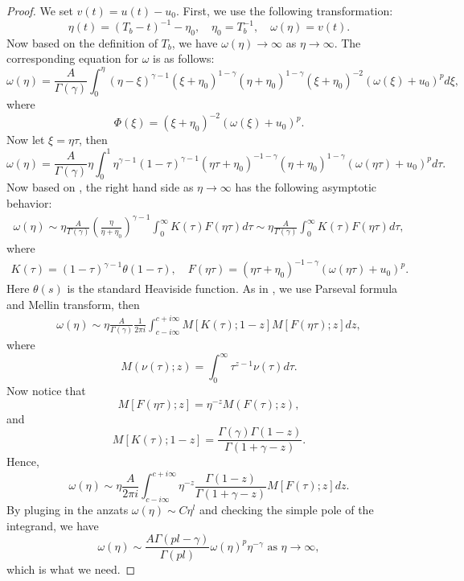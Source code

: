 \documentclass[12pt]{amsart}%
\theoremstyle{definition}
\theoremstyle{remark}
\begin{document}
\begin{proof}
We set $v(t)=u(t)-u_0$. First, we use the following transformation:
\begin{equation}
\eta(t)=(T_b-t)^{-1}-\eta_0,\quad \eta_0=T_b^{-1},\quad \omega(\eta)=v(t).
\end{equation}
Now based on the definition of $T_b$, we have $\omega(\eta)\rightarrow \infty$ as $\eta\rightarrow \infty$. The corresponding equation for $\omega$ is as follows:
\begin{equation}\label{23}
\omega(\eta)=\frac{A}{\Gamma(\gamma)}\int_0^{\eta}(\eta-\xi)^{\gamma-1}(\xi+\eta_0)^{1-\gamma}(\eta+\eta_0)^{1-\gamma}(\xi+\eta_0)^{-2}(\omega(\xi)+u_0)^pd\xi,
\end{equation}
where
\begin{equation}
\Phi(\xi)=(\xi+\eta_0)^{-2}(\omega(\xi)+u_0)^p.
\end{equation}
Now let $\xi=\eta\tau$, then 
\begin{equation}
\omega(\eta)=\frac{A}{\Gamma(\gamma)}\eta\int_0^1\eta^{\gamma-1}(1-\tau)^{\gamma-1}(\eta\tau+\eta_0)^{-1-\gamma}(\eta+\eta_0)^{1-\gamma}(\omega(\eta\tau)+u_0)^pd\tau.
\end{equation}
Now based on \cite{bleistein1975asymptotic}, the right hand side as $\eta\rightarrow \infty$ has the following asymptotic behavior:
\begin{align*}
\omega(\eta)\sim \eta\frac{A}{\Gamma(\gamma)}\left(\frac{\eta}{\eta+\eta_0}\right)^{\gamma-1}\int_0^{\infty}K(\tau)F(\eta\tau)d\tau\sim \eta \frac{A}{\Gamma(\gamma)}\int_0^{\infty}K(\tau)F(\eta\tau)d\tau,
\end{align*}
where
\begin{align*}
K(\tau)=(1-\tau)^{\gamma-1}\theta(1-\tau),\quad F(\eta\tau)=(\eta\tau+\eta_0)^{-1-\gamma}(\omega(\eta\tau)+u_0)^p.
\end{align*}
Here $\theta(s)$ is the standard Heaviside function. As in \cite{bleistein1975asymptotic}, we use Parseval formula and Mellin transform, then
\begin{align*}
\omega(\eta)\sim \eta  \frac{A}{\Gamma(\gamma)} \frac{1}{2\pi i}\int_{c-i\infty}^{c+i\infty} M[K(\tau);1-z]M[F(\eta\tau);z]dz,
\end{align*}
where 
$$
M(\nu(\tau);z)=\int_0^{\infty} \tau^{z-1}\nu(\tau)d\tau.
$$
Now notice that
$$
M[F(\eta\tau);z]=\eta^{-z}M(F(\tau);z),
$$
and
$$
M[K(\tau);1-z]=\frac{\Gamma(\gamma)\Gamma(1-z)}{\Gamma(1+\gamma-z)}.
$$
Hence,
$$
\omega(\eta)\sim \eta \frac{A}{2\pi i}\int_{c-i\infty}^{c+i\infty}\eta^{-z}\frac{\Gamma(1-z)}{\Gamma(1+\gamma-z)}M[F(\tau);z]dz.
$$
By pluging in the anzats $\omega(\eta)\sim C\eta^{l}$ and checking the simple pole of the integrand, we have
$$
\omega(\eta)\sim \frac{A\Gamma(pl-\gamma)}{\Gamma(pl)}\omega(\eta)^{p}\eta^{-\gamma} \mbox{ as }\eta\rightarrow \infty,
$$
which is what we need.
\end{proof}
\end{document}
